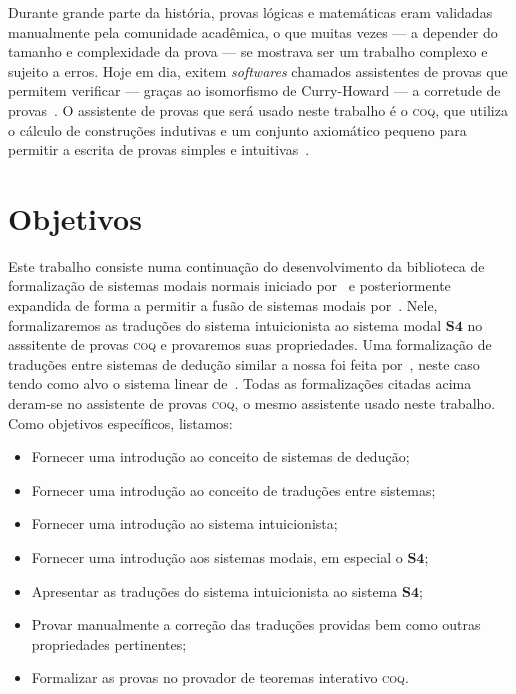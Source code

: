 Durante grande parte da história, provas lógicas e matemáticas eram validadas manualmente pela comunidade acadêmica, o que muitas vezes --- a depender do tamanho e complexidade da prova --- se mostrava ser um trabalho complexo e sujeito a erros. Hoje em dia, exitem \textit{softwares} chamados assistentes de provas que permitem verificar --- graças ao isomorfismo de Curry-Howard --- a corretude de provas~\citep{Chlipala}. O assistente de provas que será usado neste trabalho é o \textsc{coq}, que utiliza o cálculo de construções indutivas e um conjunto axiomático pequeno para permitir a escrita de provas simples e intuitivas~\citep{Coq}.

    \section{Objetivos}
    Este trabalho consiste numa continuação do desenvolvimento da biblioteca de formalização de sistemas modais normais iniciado por~\cite{Silveira} e posteriormente expandida de forma a permitir a fusão de sistemas modais por~\cite{Nunes}. Nele, formalizaremos as traduções do sistema intuicionista ao sistema modal $\mathbf{S4}$ no asssitente de provas \textsc{coq} e provaremos suas propriedades. Uma formalização de traduções entre sistemas de dedução similar a nossa foi feita por~\cite{Sehnem}, neste caso tendo como alvo o sistema linear de~\cite{Girard}. Todas as formalizações citadas acima deram-se no assistente de provas \textsc{coq}, o mesmo assistente usado neste trabalho. Como objetivos específicos, listamos:

    \begin{itemize}
        \item Fornecer uma introdução ao conceito de sistemas de dedução;
        \item Fornecer uma introdução ao conceito de traduções entre sistemas;
        \item Fornecer uma introdução ao sistema intuicionista;
        \item Fornecer uma introdução aos sistemas modais, em especial o $\mathbf{S4}$;
        \item Apresentar as traduções do sistema intuicionista ao sistema $\mathbf{S4}$;
        \item Provar manualmente a correção das traduções providas bem como outras propriedades pertinentes;
        \item Formalizar as provas no provador de teoremas interativo \textsc{coq}.
    \end{itemize}

